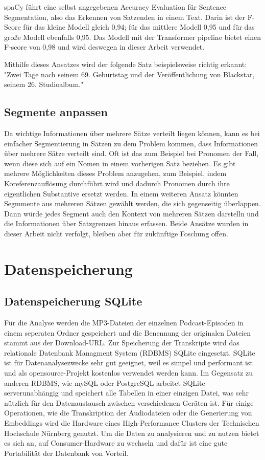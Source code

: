 spaCy führt eine selbst angegebenen Accuracy Evaluation für Sentence Segmentation, also das Erkennen von Satzenden in einem Text.
Darin ist der F-Score für das kleine Modell gleich 0,94; für das mittlere Modell 0,95 und für das große Modell ebenfalls 0,95.
Das Modell mit der Transformer pipeline bietet einen F-score von 0,98 und wird deswegen in dieser Arbeit verwendet. \cite{spacy2024}

Mithilfe dieses Ansatzes wird der folgende Satz beispielsweise richtig erkannt: 
"Zwei Tage nach seinem 69. Geburtstag und der Veröffentlichung von Blackstar, seinem 26. Studioalbum."

\subsection{Segmente anpassen}

Da wichtige Informationen über mehrere Sätze verteilt liegen können, kann es bei einfacher Segmentierung in Sätzen zu dem Problem kommen, dass Informationen über mehrere Sätze verteilt sind.
Oft ist das zum Beispiel bei Pronomen der Fall, wenn diese sich auf ein Nomen in einem vorherigen Satz beziehen.
Es gibt mehrere Möglichkeiten dieses Problem anzugehen, zum Beispiel, indem Koreferenzauflösung durchführt wird und dadurch Pronomen durch ihre eigentlichen Substantive ersetzt werden.
In einem weiteren Ansatz könnten Segmmente aus mehreren Sätzen gewählt werden, die sich gegenseitig überlappen.
Dann würde jedes Segment auch den Kontext von mehreren Sätzen darstelln und die Informationen über Satzgrenzen hinaus erfassen.
Beide Ansätze wurden in dieser Arbeit nicht verfolgt, bleiben aber für zukünftige Foschung offen.


\section{Datenspeicherung}

\subsection{Datenspeicherung SQLite}

Für die Analyse werden die MP3-Dateien der einzelnen Podcast-Episoden in einem seperaten Ordner gespeichert und die Benennung der originalen Dateien stammt aus der Download-URL.
Zur Speicherung der Transkripte wird das relationale Datenbank Managment System (RDBMS) SQLite  eingesetzt. SQLite ist für Datenanalysezwecke sehr gut geeignet, weil es simpel und performant ist und als opensource-Projekt kostenlos verwendet werden kann.
Im Gegensatz zu anderen RDBMS, wie mySQL oder PostgreSQL arbeitet SQLite serverunabhängig und speichert alle Tabellen in einer einzigen Datei, was sehr nützlich für den Datenaustausch zwischen verschiedenen Geräten ist.
Für einige Operationen, wie die Transkription der Audiodateien oder die Generierung von Embeddings wird die Hardware eines High-Performance Clusters der Technischen Hochschule Nürnberg genutzt. 
Um die Daten zu analysieren und zu nutzen bietet es sich an, auf Consumer-Hardware zu wechseln und dafür ist eine gute Portabilität der Datenbank von Vorteil.

